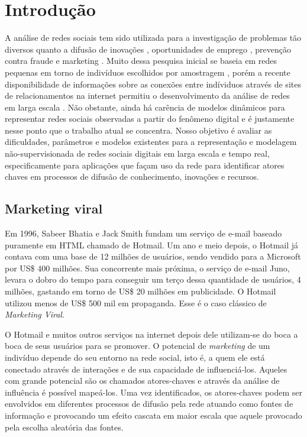 \chapter{Introdução}
\label{ch:introducao}
A análise de redes sociais tem sido utilizada para a investigação de problemas
tão diversos quanto a difusão de inovações \citep{Coleman1966}, oportunidades de
emprego \citep{Granovetter1995}, prevenção contra fraude \citep{Neville2005} e
marketing \citep{Domingos2001}. Muito dessa pesquisa inicial se baseia em redes
pequenas em torno de indivíduos escolhidos por amostragem
\citep{Wasserman}\citep{Newman2006}, porém a recente disponibilidade de
informações sobre as conexões entre indíviduos através de sites de
relacionamentos na internet permitiu o desenvolvimento da análise de redes em
larga escala \citep{Boyd2007}. Não obstante, ainda há carência de modelos
dinâmicos para representar redes sociais observadas a partir do fenômeno
digital \citep{Xiang2010} e é justamente nesse ponto que o trabalho atual se
concentra. Nosso objetivo é avaliar as dificuldades, parâmetros e modelos
existentes para a representação e modelagem não-supervisionada de redes sociais
digitais em larga escala e tempo real, especificamente para aplicações que façam
uso da rede para identificar atores chaves em processos de difusão de
conhecimento, inovações e recursos.

\section{Marketing viral}
\label{sec:viral}

Em 1996, Sabeer Bhatia e Jack Smith fundam um serviço de e-mail baseado
puramente em HTML chamado de Hotmail. Um ano e meio depois, o Hotmail já contava
com uma base de 12 milhões de usuários, sendo vendido para a Microsoft por US\$
400 milhões. Sua concorrente mais próxima, o serviço de e-mail Juno, levara o
dobro do tempo para conseguir um terço dessa quantidade de usuários, 4 milhões,
gastando em torno de US\$ 20 milhões em publicidade. O Hotmail utilizou menos de
US\$ 500 mil em propaganda. Esse é o caso clássico de \emph{Marketing Viral}.

O Hotmail e muitos outros serviços na internet depois dele utilizam-se do boca a
boca de seus usuários para se promover. O potencial de \emph{marketing} de um
indivíduo depende do seu entorno na rede social, isto é, a quem ele está
conectado através de interações e de sua capacidade de influenciá-los. Aqueles
com grande potencial são os chamados atores-chaves e através da análise de
influência é possível mapeá-los. Uma vez identificados, os atores-chaves podem
ser envolvidos em diferentes processos de difusão pela rede atuando como fontes
de informação e provocando um efeito cascata em maior escala que aquele
provocado pela escolha aleatória das fontes.

